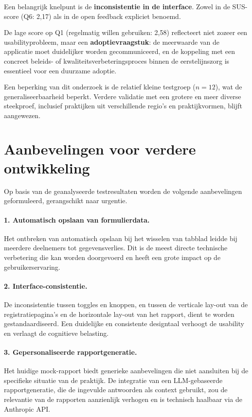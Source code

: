 Een belangrijk knelpunt is de \textbf{inconsistentie in de interface}. Zowel in de SUS-score (Q6: 2,17) als in de open feedback expliciet benoemd.
\medskip

De lage score op Q1 (regelmatig willen gebruiken: 2,58) reflecteert niet zozeer een usabilityprobleem, maar een \textbf{adoptievraagstuk}: de meerwaarde van de applicatie moet duidelijker worden gecommuniceerd, en de koppeling met een concreet beleids- of kwaliteitsverbeteringsproces binnen de eerstelijnszorg is essentieel voor een duurzame adoptie.
\medskip

Een beperking van dit onderzoek is de relatief kleine testgroep ($n = 12$), wat de generaliseerbaarheid beperkt.
Verdere validatie met een grotere en meer diverse steekproef, inclusief praktijken uit verschillende regio's en praktijkvormen, blijft aangewezen.

\section{Aanbevelingen voor verdere ontwikkeling}
\label{sec:aanbevelingen}

Op basis van de geanalyseerde testresultaten worden de volgende aanbevelingen geformuleerd, gerangschikt naar urgentie.
 
\paragraph{1. Automatisch opslaan van formulierdata.}
Het ontbreken van automatisch opslaan bij het wisselen van tabblad leidde bij meerdere deelnemers tot gegevensverlies.
Dit is de meest directe technische verbetering die kan worden doorgevoerd en heeft een grote impact op de gebruikerservaring.
 
\paragraph{2. Interface-consistentie.}
De inconsistentie tussen toggles en knoppen, en tussen de verticale lay-out van de registratiepagina's en de horizontale lay-out van het rapport, dient te worden gestandaardiseerd.
Een duidelijke en consistente designtaal verhoogt de usability en verlaagt de cognitieve belasting.
 
\paragraph{3. Gepersonaliseerde rapportgeneratie.}
Het huidige mock-rapport biedt generieke aanbevelingen die niet aansluiten bij de specifieke situatie van de praktijk.
De integratie van een LLM-gebaseerde rapportgeneratie, die de ingevulde antwoorden als context gebruikt, zou de relevantie van de rapporten aanzienlijk verhogen en is technisch haalbaar via de Anthropic API.
 
